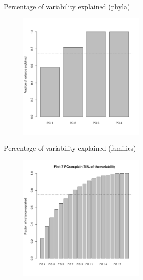 \documentclass{beamer}
\begin{document}
\begin{frame}{Percentage of variability explained (phyla)}

\begin{center}
\begin{figure}
  \includegraphics[width=2.5in]{phyla_prcomp_expl_barchart}
\end{figure}
\end{center}
\vspace{-0.1in}

\end{frame}



\begin{frame}{Percentage of variability explained (families)}

\begin{center}
\begin{figure}
  \includegraphics[width=2.5in]{families_prcomp_expl_barchart}
\end{figure}
\end{center}
\vspace{-0.1in}

\end{frame}
\end{document}
